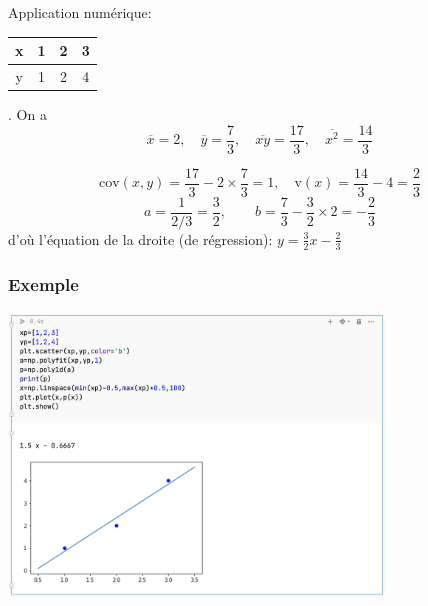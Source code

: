 \documentclass{beamer}
\begin{document}
\begin{frame}
Application numérique:
\begin{tabular}{c|ccc}
x&1&2&3 \\ \hline
y&1&2&4
\end{tabular}. On a
\[\overline{x}=2,\quad \overline{y}=\frac 73, \quad  \overline{x y}=\frac{17}3,\quad  \overline{x^2}=\frac{14}3\]

\[ \mbox{cov}(x,y)=\frac{17}3-2\times \frac{7}3=1,\quad \mbox{v}(x)= \frac{14}3-4= \frac{2}3\]
\[a=\frac{1}{2/3}=\frac 32,\qquad b=\frac 73-\frac 32\times 2=-\frac 23\]
d'où l'équation de la droite (de régression): $y=\frac{3}{2}x-\frac 23$
\begin{center}


\end{center}

\end{frame}


\begin{frame}
 \frametitle{Exemple}
\begin{center}
\includegraphics[width=10cm]{images/approximationRegression00.png}
\end{center}
\end{frame}
\end{document}
